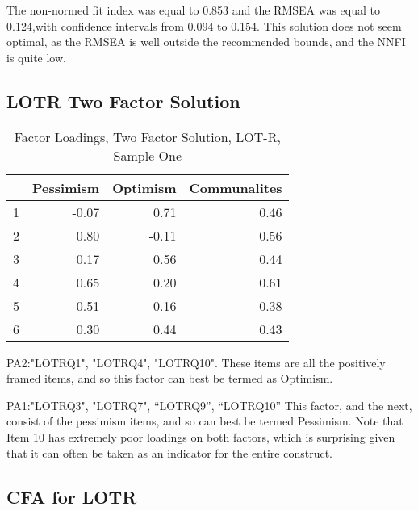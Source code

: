 \documentclass{article}
\begin{document}
The non-normed fit index was equal to 0.853
and the RMSEA was equal to 0.124,with confidence intervals from 0.094 to 0.154.  This solution does not seem optimal, as the RMSEA is well outside the recommended bounds, and the NNFI is quite low.  %




\subsection{LOTR Two Factor Solution}
\label{sec:lotr-two-factor}

\begin{table}[ht]
\centering
\begin{tabular}{rrrr}
  \hline
 & Pessimism & Optimism & Communalites \\ 
  \hline
1 & -0.07 & 0.71 & 0.46 \\ 
  2 & 0.80 & -0.11 & 0.56 \\ 
  3 & 0.17 & 0.56 & 0.44 \\ 
  4 & 0.65 & 0.20 & 0.61 \\ 
  5 & 0.51 & 0.16 & 0.38 \\ 
  6 & 0.30 & 0.44 & 0.43 \\ 
   \hline
\end{tabular}
\caption{Factor Loadings, Two Factor Solution, LOT-R, Sample One} 
\label{tab:tcq1lotr2fact}
\end{table}
PA2:"LOTRQ1",  "LOTRQ4",  "LOTRQ10". These items are all the positively framed items, and so this factor can best be termed as Optimism. 

PA1:"LOTRQ3", "LOTRQ7", ``LOTRQ9'', ``LOTRQ10'' This factor, and the next, consist of the pessimism items, and so can best be termed Pessimism. Note that Item 10 has extremely poor loadings on both factors, which is surprising given that it can often be taken as an indicator for the entire construct. 


\subsection{CFA for LOTR}
\label{sec:cfa-lotr}
\end{document}
